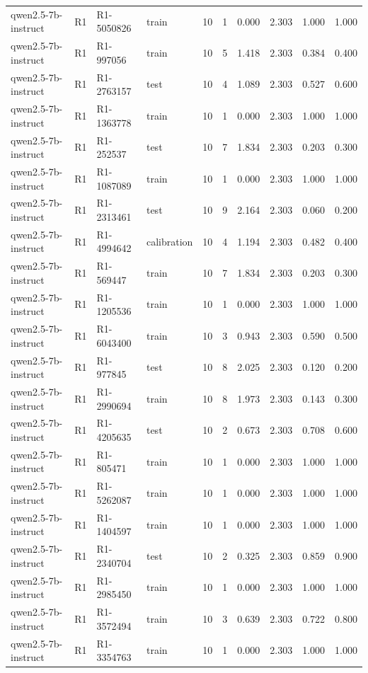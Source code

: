 \begin{table}
\begin{tabular}{llllrrrrrr}
qwen2.5-7b-instruct & R1 & R1-5050826 & train & 10 & 1 & 0.000 & 2.303 & 1.000 & 1.000 \\
qwen2.5-7b-instruct & R1 & R1-997056 & train & 10 & 5 & 1.418 & 2.303 & 0.384 & 0.400 \\
qwen2.5-7b-instruct & R1 & R1-2763157 & test & 10 & 4 & 1.089 & 2.303 & 0.527 & 0.600 \\
qwen2.5-7b-instruct & R1 & R1-1363778 & train & 10 & 1 & 0.000 & 2.303 & 1.000 & 1.000 \\
qwen2.5-7b-instruct & R1 & R1-252537 & test & 10 & 7 & 1.834 & 2.303 & 0.203 & 0.300 \\
qwen2.5-7b-instruct & R1 & R1-1087089 & train & 10 & 1 & 0.000 & 2.303 & 1.000 & 1.000 \\
qwen2.5-7b-instruct & R1 & R1-2313461 & test & 10 & 9 & 2.164 & 2.303 & 0.060 & 0.200 \\
qwen2.5-7b-instruct & R1 & R1-4994642 & calibration & 10 & 4 & 1.194 & 2.303 & 0.482 & 0.400 \\
qwen2.5-7b-instruct & R1 & R1-569447 & train & 10 & 7 & 1.834 & 2.303 & 0.203 & 0.300 \\
qwen2.5-7b-instruct & R1 & R1-1205536 & train & 10 & 1 & 0.000 & 2.303 & 1.000 & 1.000 \\
qwen2.5-7b-instruct & R1 & R1-6043400 & train & 10 & 3 & 0.943 & 2.303 & 0.590 & 0.500 \\
qwen2.5-7b-instruct & R1 & R1-977845 & test & 10 & 8 & 2.025 & 2.303 & 0.120 & 0.200 \\
qwen2.5-7b-instruct & R1 & R1-2990694 & train & 10 & 8 & 1.973 & 2.303 & 0.143 & 0.300 \\
qwen2.5-7b-instruct & R1 & R1-4205635 & test & 10 & 2 & 0.673 & 2.303 & 0.708 & 0.600 \\
qwen2.5-7b-instruct & R1 & R1-805471 & train & 10 & 1 & 0.000 & 2.303 & 1.000 & 1.000 \\
qwen2.5-7b-instruct & R1 & R1-5262087 & train & 10 & 1 & 0.000 & 2.303 & 1.000 & 1.000 \\
qwen2.5-7b-instruct & R1 & R1-1404597 & train & 10 & 1 & 0.000 & 2.303 & 1.000 & 1.000 \\
qwen2.5-7b-instruct & R1 & R1-2340704 & test & 10 & 2 & 0.325 & 2.303 & 0.859 & 0.900 \\
qwen2.5-7b-instruct & R1 & R1-2985450 & train & 10 & 1 & 0.000 & 2.303 & 1.000 & 1.000 \\
qwen2.5-7b-instruct & R1 & R1-3572494 & train & 10 & 3 & 0.639 & 2.303 & 0.722 & 0.800 \\
qwen2.5-7b-instruct & R1 & R1-3354763 & train & 10 & 1 & 0.000 & 2.303 & 1.000 & 1.000 \\

\end{tabular}
\end{table}
